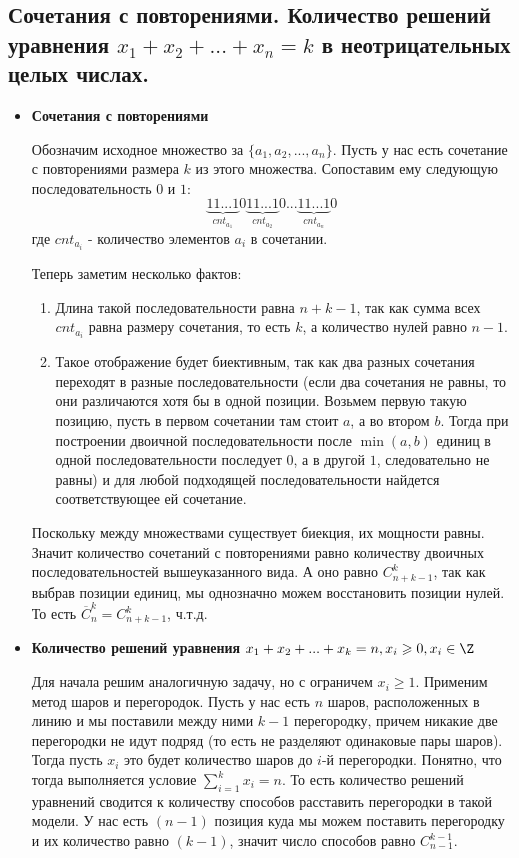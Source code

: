 \subsection{Сочетания с повторениями. Количество решений уравнения $x_1 + x_2 + ... + x_n = k$ в неотрицательных целых числах.}

\begin{itemize}
	\item \textbf{Сочетания с повторениями}
	
	Обозначим исходное множество за $\{a_1, a_2, ..., a_n\}$. Пусть у нас есть сочетание с повторениями размера $k$ из этого множества. Сопоставим ему следующую последовательность $0$ и $1$:
	$$\underbrace{11...1}_{cnt_{a_1}}0\underbrace{11...1}_{cnt_{a_2}}0...\underbrace{11...1}_{cnt_{a_n}}0$$
	где $cnt_{a_i}$ - количество элементов $a_i$ в сочетании.
	
	Теперь заметим несколько фактов:
	\begin{enumerate}
		\item Длина такой последовательности равна $n + k - 1$, так как сумма всех $cnt_{a_i}$ равна размеру сочетания, то есть $k$, а количество нулей равно $n - 1$.
		\item Такое отображение будет биективным, так как два разных сочетания переходят в разные последовательности (если два сочетания не равны, то они различаются хотя бы в одной позиции. Возьмем первую такую позицию, пусть в первом сочетании там стоит $a$, а во втором $b$. Тогда при построении двоичной последовательности после $\min{(a, b)}$ единиц в одной последовательности последует $0$, а в другой $1$, следовательно не равны) и для любой подходящей последовательности найдется соответствующее ей сочетание.
	\end{enumerate}

	Поскольку между множествами существует биекция, их мощности равны. Значит количество сочетаний с повторениями равно количеству двоичных последовательностей вышеуказанного вида. А оно равно $C^k_{n+k-1}$, так как выбрав позиции единиц, мы однозначно можем восстановить позиции нулей. То есть $\overline C^k_n = C^k_{n+k-1}$, ч.т.д.
	
	\item \textbf{Количество решений уравнения $x_1 + x_2 + ... + x_k = n, x_i \geqslant 0, x_i \in \Z$}
	
	Для начала решим аналогичную задачу, но с ограничем $x_i \geqslant 1$. Применим метод шаров и перегородок. Пусть у нас есть $n$ шаров, расположенных в линию и мы поставили между ними $k - 1$ перегородку, причем никакие две перегородки не идут подряд (то есть не разделяют одинаковые пары шаров). Тогда пусть $x_i$ это будет количество шаров до $i$-й перегородки. Понятно, что тогда выполняется условие $\sum_{i=1}^{k}x_i = n$. То есть количество решений уравнений сводится к количеству способов расставить перегородки в такой модели. У нас есть $(n - 1)$ позиция куда мы можем поставить перегородку и их количество равно $(k - 1)$, значит число способов равно $C^{k-1}_{n-1}$.
	

\end{itemize}
